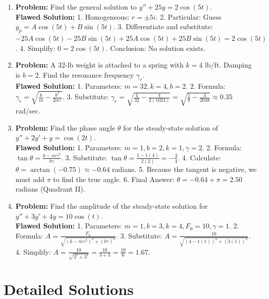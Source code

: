 \documentclass[11pt]{article}
\begin{document}
\begin{enumerate}[label=\textbf{\arabic*.}, resume]
    \item \textbf{Problem:} Find the general solution to $y'' + 25y = 2 \cos(5t)$. \\
    \textbf{Flawed Solution:} 1. Homogeneous: $r = \pm 5i$. 2. Particular: Guess $y_p = A \cos(5t) + B \sin(5t)$. 3. Differentiate and substitute: $-25A \cos(5t) - 25B \sin(5t) + 25A \cos(5t) + 25B \sin(5t) = 2 \cos(5t)$. 4. Simplify: $0 = 2 \cos(5t)$. Conclusion: No solution exists.
    
    \item \textbf{Problem:} A 32-lb weight is attached to a spring with $k = 4$ lb/ft. Damping is $b = 2$. Find the resonance frequency $\gamma_r$. \\
    \textbf{Flawed Solution:} 1. Parameters: $m = 32, k = 4, b = 2$. 2. Formula: $\gamma_r = \sqrt{\frac{k}{m} - \frac{b^2}{2m^2}}$. 3. Substitute: $\gamma_r = \sqrt{\frac{4}{32} - \frac{4}{2(1024)}} = \sqrt{\frac{1}{8} - \frac{4}{2048}} \approx 0.35$ rad/sec.
    
    \item \textbf{Problem:} Find the phase angle $\theta$ for the steady-state solution of $y'' + 2y' + y = \cos(2t)$. \\
    \textbf{Flawed Solution:} 1. Parameters: $m=1, b=2, k=1, \gamma=2$. 2. Formula: $\tan \theta = \frac{k-m\gamma^2}{b\gamma}$. 3. Substitute: $\tan \theta = \frac{1 - 1(4)}{2(2)} = -\frac{3}{4}$. 4. Calculate: $\theta = \arctan(-0.75) \approx -0.64$ radians. 5. Because the tangent is negative, we must add $\pi$ to find the true angle. 6. Final Answer: $\theta = -0.64 + \pi = 2.50$ radians (Quadrant II).
    
    \item \textbf{Problem:} Find the amplitude of the steady-state solution for $y'' + 3y' + 4y = 10 \cos(t)$. \\
    \textbf{Flawed Solution:} 1. Parameters: $m=1, b=3, k=4, F_0=10, \gamma=1$. 2. Formula: $A = \frac{F_0}{\sqrt{(k-m\gamma^2)^2 + (b\gamma)^2}}$. 3. Substitute: $A = \frac{10}{\sqrt{(4-1(1))^2 + (3(1))^2}}$. 4. Simplify: $A = \frac{10}{\sqrt{3^2 + 3^2}} = \frac{10}{3 + 3} = \frac{10}{6} = 1.67$.
\end{enumerate}

\newpage

\section{Detailed Solutions}
\end{document}
